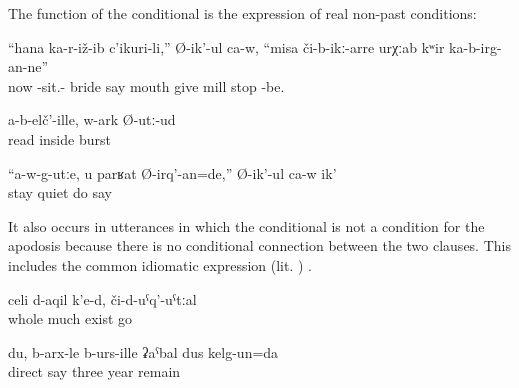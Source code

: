 The function of the conditional is the expression of real non-past conditions: 
%
\begin{exe}
	\ex	\label{ex:‎The bride who just married}
	\gll	``hana	ka-r-iž-ib	c'ikuri-li,''	Ø-ik'-ul	ca-w,	``misa či-b-ikː-arre	urχːab	kʷir	ka-b-irg-an-ne''\\
		now	-sit.-	bride	say		mouth	give	mill	stop	-be.\\
	\glt	{}

	\ex	\label{ex:If I do not read (my song), I burst inside.}
	\gll	a-b-elč'-ille,	w-ark	Ø-utː-ud\\
		read	\tsc{m-}inside	burst\\
	\glt	{}

	\ex	\label{ex:‎‎‎If you (= masc.) do not calm down, I make you calm, he says}
	\gll	``a-w-g-utːe,	u	parʁat	Ø-irq'-an=de,''	Ø-ik'-ul	ca-w	ik'\\
		stay		quiet	do	say		\\
	\glt	{}
\end{exe}

It also occurs in utterances in which the conditional is not a condition for the apodosis because there is no conditional connection between the two clauses. This includes the common idiomatic expression  (lit. ) .
%
\begin{exe}
	\ex	\label{ex:‎‎There is much there (i.e. the graveyard is large), if you go there}
	\gll	celi d-aqil	k'e-d,	či-d-uˁq'-uˁtːal\\
		whole	much	exist		go\\
	\glt	{}

	\ex	\label{ex:I, to be honest, remained for three years.}
	\gll	du,	b-arx-le	b-urs-ille	ʡaˁbal	dus	kelg-un=da\\
			direct	say		three	year	remain\\
	\glt	{}
\end{exe}

